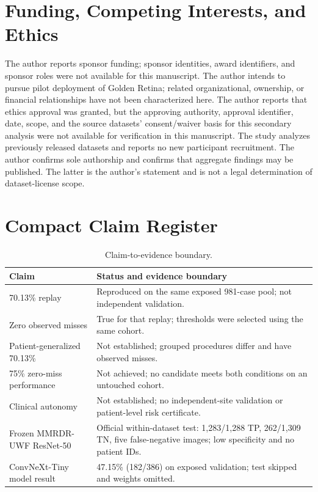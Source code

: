 \documentclass[11pt]{article}
\begin{document}
\section*{Funding, Competing Interests, and Ethics}
The author reports sponsor funding; sponsor identities, award identifiers, and sponsor roles were not available for this manuscript. The author intends to pursue pilot deployment of Golden Retina; related organizational, ownership, or financial relationships have not been characterized here. The author reports that ethics approval was granted, but the approving authority, approval identifier, date, scope, and the source datasets' consent/waiver basis for this secondary analysis were not available for verification in this manuscript. The study analyzes previously released datasets and reports no new participant recruitment. The author confirms sole authorship and confirms that aggregate findings may be published. The latter is the author's statement and is not a legal determination of dataset-license scope.

\appendix
\section{Compact Claim Register}
\begin{table}[h]
\centering
\caption{Claim-to-evidence boundary.}
\begin{tabularx}{\linewidth}{lX}
\toprule
Claim & Status and evidence boundary \\
\midrule
70.13\% replay & Reproduced on the same exposed 981-case pool; not independent validation.\\
Zero observed misses & True for that replay; thresholds were selected using the same cohort.\\
Patient-generalized 70.13\% & Not established; grouped procedures differ and have observed misses.\\
75\% zero-miss performance & Not achieved; no candidate meets both conditions on an untouched cohort.\\
Clinical autonomy & Not established; no independent-site validation or patient-level risk certificate.\\
Frozen MMRDR-UWF ResNet-50 & Official within-dataset test: 1,283/1,288 TP, 262/1,309 TN, five false-negative images; low specificity and no patient IDs.\\
ConvNeXt-Tiny model result & 47.15\% (182/386) on exposed validation; test skipped and weights omitted.\\
\bottomrule
\end{tabularx}
\end{table}
\end{document}
